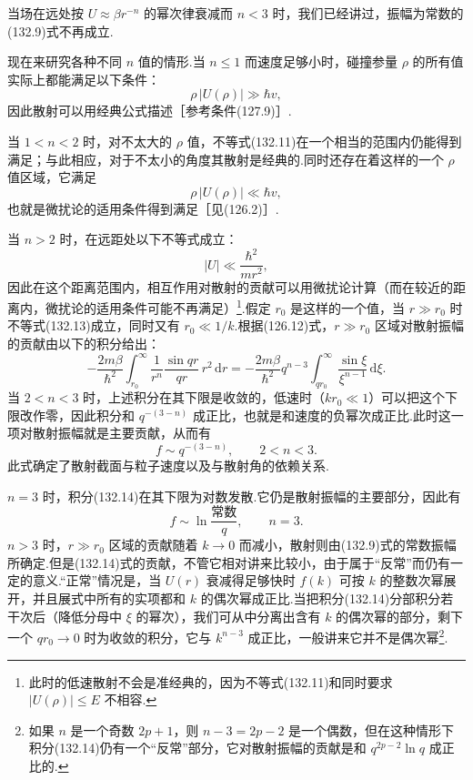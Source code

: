 当场在远处按 $U\approx\beta r^{-n}$ 的幂次律衰减而 $n<3$ 时，我们已经讲过，振幅为常数的(132.9)式不再成立.

现在来研究各种不同 $n$ 值的情形.当 $n\leqslant1$ 而速度足够小时，碰撞参量 $\rho$ 的所有值实际上都能满足以下条件：
\begin{equation}
  \rho\,|U(\rho)|\gg\hbar v,
\end{equation}
因此散射可以用经典公式描述［参考条件(127.9)］.

当 $1<n<2$ 时，对不太大的 $\rho$ 值，不等式(132.11)在一个相当的范围内仍能得到满足；与此相应，对于不太小的角度其散射是经典的.同时还存在着这样的一个 $\rho$ 值区域，它满足
\begin{equation}
  \rho\,|U(\rho)|\ll\hbar v,
\end{equation}
也就是微扰论的适用条件得到满足［见(126.2)］.

当 $n>2$ 时，在远距处以下不等式成立：
\begin{equation}
  |U|\ll\frac{\hbar^2}{mr^2},
\end{equation}
因此在这个距离范围内，相互作用对散射的贡献可以用微扰论计算（而在较近的距离内，微扰论的适用条件可能不再满足）\footnote{此时的低速散射不会是准经典的，因为不等式(132.11)和同时要求 $|U(\rho)|\leqslant E$ 不相容.}.假定 $r_0$ 是这样的一个值，当 $r\gg r_0$ 时不等式(132.13)成立，同时又有 $r_0\ll1/k$.根据(126.12)式，$r\gg r_0$ 区域对散射振幅的贡献由以下的积分给出：
\begin{equation}
  -\frac{2m\beta}{\hbar^2}\int_{r_0}^{\infty}
  \frac{1}{r^n}\frac{\sin qr}{qr}\,r^2\,\mathrm{d}r
  =-\frac{2m\beta}{\hbar^2}q^{n-3}
  \int_{qr_0}^{\infty}\frac{\sin\xi}{\xi^{n-1}}\,\mathrm{d}\xi.
\end{equation}
当 $2<n<3$ 时，上述积分在其下限是收敛的，低速时（$kr_0\ll1$）可以把这个下限改作零，因此积分和 $q^{-(3-n)}$ 成正比，也就是和速度的负幂次成正比.此时这一项对散射振幅就是主要贡献，从而有
\begin{equation}
  f\sim q^{-(3-n)},\qquad 2<n<3.
\end{equation}
此式确定了散射截面与粒子速度以及与散射角的依赖关系.

$n=3$ 时，积分(132.14)在其下限为对数发散.它仍是散射振幅的主要部分，因此有
\begin{equation}
  f\sim\ln\frac{\text{常数}}{q},\qquad n=3.
\end{equation}
$n>3$ 时，$r\gg r_0$ 区域的贡献随着 $k\to0$ 而减小，散射则由(132.9)式的常数振幅所确定.但是(132.14)式的贡献，不管它相对讲来比较小，由于属于“反常”而仍有一定的意义.“正常”情况是，当 $U(r)$ 衰减得足够快时 $f(k)$ 可按 $k$ 的整数次幂展开，并且展式中所有的实项都和 $k$ 的偶次幂成正比.当把积分(132.14)分部积分若干次后（降低分母中 $\xi$ 的幂次），我们可从中分离出含有 $k$ 的偶次幂的部分，剩下一个 $qr_0\to0$ 时为收敛的积分，它与 $k^{n-3}$ 成正比，一般讲来它并不是偶次幂\footnote{如果 $n$ 是一个奇数 $2p+1$，则 $n-3=2p-2$ 是一个偶数，但在这种情形下积分(132.14)仍有一个“反常”部分，它对散射振幅的贡献是和 $q^{2p-2}\ln q$ 成正比的.}.

